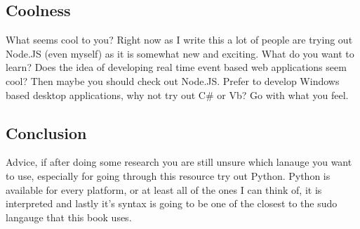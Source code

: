 \subsection{Coolness}
What seems cool to you? Right now as I write this a lot of people are trying out Node.JS (even myself) as it is somewhat new and exciting.
What do you want to learn? Does the idea of developing real time event based web applications seem cool? Then maybe you should check out
Node.JS. Prefer to develop Windows based desktop applications, why not try out C\# or Vb? Go with what you feel.

\subsection{Conclusion}
Advice, if after doing some research you are still unsure which lanauge you want to use, especially for going through this resource try out
Python. Python is available for every platform, or at least all of the ones I can think of, it is interpreted and lastly it's syntax is
going to be one of the closest to the sudo langauge that this book uses.

